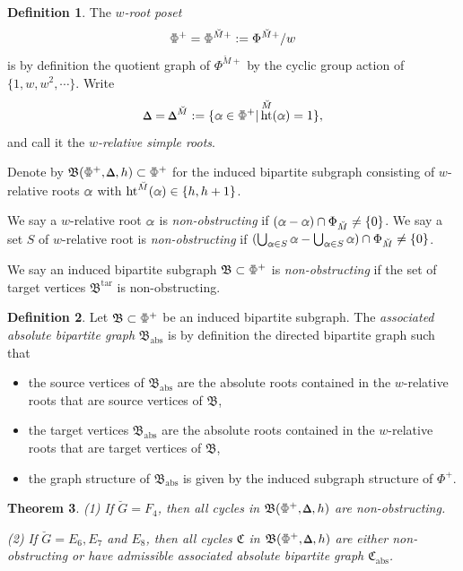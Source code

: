 \documentclass[11pt]{amsart}
\newcommand{\MINOREDITED}[1]{#1}
\newtheorem{thm}{Theorem}[section]
\theoremstyle{definition}
\newtheorem{defn}[thm]{Definition}
\newcommand{\doublestroke}[1]{\pdfliteral{1 Tr .3 w}#1\pdfliteral{0 Tr 0 w}}
\newcommand{\BPhi}{\doublestroke{\Phi}}
\newcommand{\Balpha}{\doublestroke{\alpha}}
\newcommand{\BDelta}{%
    \scalebox{.8}{$\Delta$}%
    \llap{%
            \scalebox{.9}{$\Delta$}%
    }%
}
\newcommand{\fB}{\mathfrak{B}}
\newcommand{\fC}{\mathfrak{C}}
\newcommand{\abs}{{\operatorname{abs}}}
\newcommand{\bG}{\breve{G}}
\newcommand{\bM}{\breve{M}}
\DeclareMathOperator{\tar}{tar}
\DeclareMathOperator{\Ht}{ht}
\begin{document}
\begin{defn}
The {\it $w$-root poset}
\[
\BPhi^+
=\BPhi^{\bM+}:=\Phi^{\bM+}/w
\]
is by definition
the quotient graph of $\Phi^{\bM+}$
by the cyclic group action of $\{1, w, w^2, \cdots\}$.
Write
\[
\BDelta=\BDelta^{\bM}
:=\{\Balpha\in \BPhi^+|\Ht^{\bM}(\Balpha)=1\},
\]
and call it the {\it $w$-relative simple roots}.

Denote by $\fB(\BPhi^+, \BDelta, h)\subset \BPhi^+$
for the induced bipartite subgraph consisting
of $w$-relative roots $\Balpha$ with $\Ht^{\bM}(\Balpha)\in\{h,h+1\}$.

We say a $w$-relative root $\Balpha$
is {\it non-obstructing}
if $(\Balpha-\Balpha)\cap \Phi_{\bM}\neq \{0\}$.
We say a set $S$ of $w$-relative root
is {\it non-obstructing}
if $(\bigcup_{\Balpha\in S}\Balpha-\bigcup_{\Balpha\in S}\Balpha)\cap \Phi_{\bM}\neq \{0\}$.

We say \MINOREDITED{an} induced bipartite subgraph
$\fB\subset \BPhi^+$
is {\it non-obstructing}
if the set of target vertices
$\fB^{\tar}$ is non-obstructing.
\label{def:non-obstructing}
\end{defn}

\begin{defn}
Let $\fB\subset \BPhi^+$ be an induced bipartite subgraph.
The {\it associated absolute bipartite graph}
$\fB_{\abs}$ is by definition the directed \MINOREDITED{bipartite} graph such that
\begin{itemize}
\item the source vertices of $\fB_{\abs}$ are the absolute roots
contained in the $w$-relative roots
that are source vertices of $\fB$,
\item the target vertices $\fB_{\abs}$ are the absolute roots
contained in the $w$-relative roots
that are target vertices of $\fB$,
\item the graph structure of $\fB_{\abs}$
is given by the induced subgraph structure of $\Phi^+$.
\end{itemize}
\end{defn}

\begin{thm}
\rm
(1) If $\bG=F_4$, then all cycles in
$\fB(\BPhi^+, \BDelta, h)$ are non-obstructing.

(2) If $\bG=E_6, E_7$ and $E_8$,
then all cycles $\fC$ in
$\fB(\BPhi^+, \BDelta, h)$ \MINOREDITED{are} either non-obstructing
or have admissible associated absolute bipartite graph
$\fC_{\abs}$.
\label{thm:twist-C6}
\end{thm}
\end{document}
